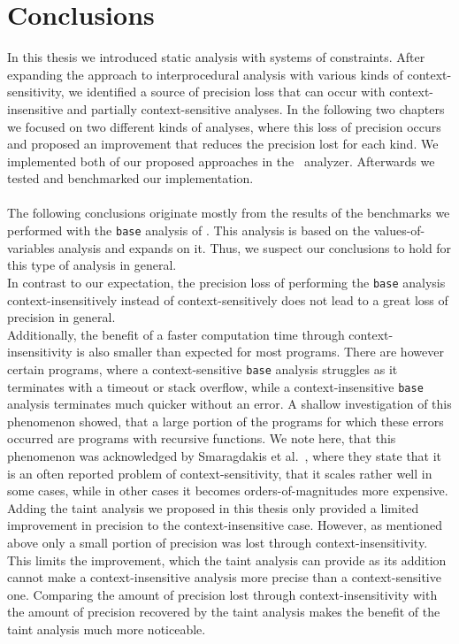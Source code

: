 
\chapter{Conclusions}\label{chapter:conclusions}
  In this thesis we introduced static analysis with systems of constraints. After expanding the approach to interprocedural analysis with various kinds of context-sensitivity, we identified a source of precision loss that can occur with context-insensitive and partially context-sensitive analyses. In the following two chapters we focused on two different kinds of analyses, where this loss of precision occurs and proposed an improvement that reduces the precision lost for each kind. We implemented both of our proposed approaches in the \gob\ analyzer. Afterwards we tested and benchmarked our implementation.\\
  \\
  The following conclusions originate mostly from the results of the benchmarks we performed with the \texttt{base} analysis of \gob. This analysis is based on the values-of-variables analysis and expands on it. Thus, we suspect our conclusions to hold for this type of analysis in general.\\
  In contrast to our expectation, the precision loss of performing the \texttt{base} analysis context-insensitively instead of context-sensitively does not lead to a great loss of precision in general.\\
  Additionally, the benefit of a faster computation time through context-insensitivity is also smaller than expected for most programs. There are however certain programs, where a context-sensitive \texttt{base} analysis struggles as it terminates with a timeout or stack overflow, while a context-insensitive \texttt{base} analysis terminates much quicker without an error. A shallow investigation of this phenomenon showed, that a large portion of the programs for which these errors occurred are programs with recursive functions. We note here, that this phenomenon was acknowledged by Smaragdakis et al.~\parencite{TODO}, where they state that it is an often reported problem of context-sensitivity, that it scales rather well in some cases, while in other cases it becomes orders-of-magnitudes more expensive.\\  
  Adding the taint analysis we proposed in this thesis only provided a limited improvement in precision to the context-insensitive case. However, as mentioned above only a small portion of precision was lost through context-insensitivity. This limits the improvement, which the taint analysis can provide as its addition cannot make a context-insensitive analysis more precise than a context-sensitive one. Comparing the amount of precision lost through context-insensitivity with the amount of precision recovered by the taint analysis makes the benefit of the taint analysis much more noticeable.\\
